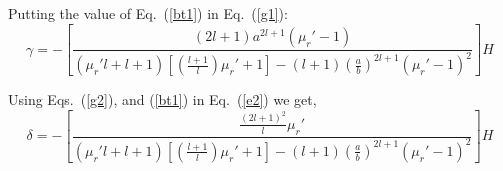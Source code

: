 

Putting the value of Eq.~(\ref{bt1}) in Eq.~(\ref{g1}):
\begin{equation}\label{g2}
\gamma=-\left[\frac{(2l+1)a^{2l+1}(\mu_r'-1)}{(\mu_r'l+l+1)\left[\left(\frac{l+1}{l}\right)\mu_r'+1\right]-(l+1)\left(\frac{a}{b}\right)^{2l+1}(\mu_r'-1)^2}\right] H    
\end{equation}


Using Eqs.~(\ref{g2}), and (\ref{bt1}) in Eq.~(\ref{e2}) we get,
\begin{equation}\label{dt1}
\delta =-\left[\frac{\frac{(2l+1)^2}{l}\mu_r'}{(\mu_r'l+l+1)\left[\left(\frac{l+1}{l}\right)\mu_r'+1\right]-(l+1)\left(\frac{a}{b}\right)^{2l+1}(\mu_r'-1)^2}\right]H    
\end{equation}


